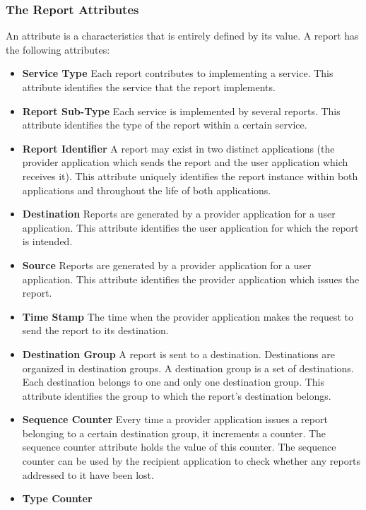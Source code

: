 \subsubsection{The Report Attributes}\label{sec:RepAttributes}

An attribute is a characteristics that is entirely defined by its value. A report has the following attributes:

\begin{itemize}
\item \textbf{Service Type}
Each report contributes to implementing a service. This attribute identifies the service that the report implements. 
\item \textbf{Report Sub-Type}
Each service is implemented by several reports. This attribute identifies the type of the report within a certain service. 
\item \textbf{Report Identifier}
A report may exist in two distinct applications (the provider application which sends the report and the user application which receives it). This attribute uniquely identifies the report instance within both applications and throughout the life of both applications.
\item \textbf{Destination}
Reports are generated by a provider application for a user application. This attribute identifies the user application for which the report is intended.
\item \textbf{Source}
Reports are generated by a provider application for a user application. This attribute identifies the provider application which issues the report.
\item \textbf{Time Stamp}
The time when the provider application makes the request to send the report to its destination.
\item \textbf{Destination Group}
A report is sent to a destination. Destinations are organized in destination groups. A destination group is a set of destinations. Each destination belongs to one and only one destination group. This attribute identifies the group to which the report's destination belongs.
\item \textbf{Sequence Counter}
Every time a provider application issues a report belonging to a certain destination group, it increments a counter. The sequence counter attribute holds the value of this counter. The sequence counter can be used by the recipient application to check whether any reports addressed to it have been lost. 
\item \textbf{Type Counter}

\end{itemize}

